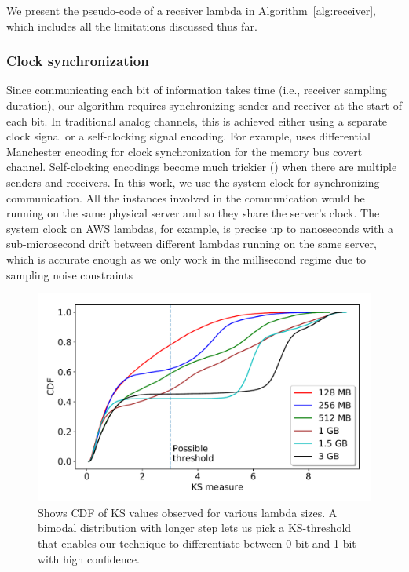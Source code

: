 We present the pseudo-code of a receiver lambda in Algorithm~\ref{alg:receiver},
which includes all the limitations discussed thus far.

\subsubsection{Clock synchronization} 
Since communicating each bit of information takes time (i.e., receiver sampling
duration), our algorithm requires synchronizing sender and receiver at the start
of each bit. In traditional analog channels, this is achieved either using a
separate clock signal or a self-clocking signal encoding. For example,
\cite{whispers} uses differential Manchester encoding for clock synchronization
for the memory bus covert channel.  Self-clocking encodings  become much
trickier () when there are multiple senders and receivers. In this
work, we use the system clock for synchronizing communication.
All the instances involved in the communication would be running on the same
physical server and so they share the server's clock.  The system clock on AWS
lambdas, for example, is precise up to nanoseconds with a sub-microsecond drift
between different lambdas running on the same server, which is accurate
enough as we only work in the millisecond regime due to sampling noise
constraints


\begin{figure}[!t]
  \includegraphics[width=.99\linewidth]{fig/ksvalues.pdf}
  \caption{Shows CDF of KS values observed for various lambda sizes. A bimodal distribution 
  with longer step lets us pick a KS-threshold that enables our technique to differentiate 
  between 0-bit and 1-bit with high confidence. 
\label{fig:ks_values}}
\end{figure}

